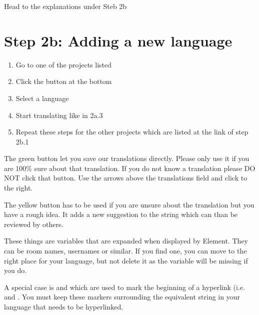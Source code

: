 \documentclass[letterpaper,10pt,openany,oneside,english]{sphinxmanual}
\begin{document}
\sphinxAtStartPar
Head to the explanations under Steb 2b


\chapter{Step 2b: Adding a new language}
\label{\detokenize{translating:step-2b-adding-a-new-language}}\begin{enumerate}
%
\item {} 
\sphinxAtStartPar
Go to one of the projects listed 

\item {} 
\sphinxAtStartPar
Click the  button at the bottom

\item {} 
\sphinxAtStartPar
Select a language

\item {} 
\sphinxAtStartPar
Start translating like in 2a.3

\item {} 
\sphinxAtStartPar
Repeat these steps for the other projects which are listed at the link of step 2b.1

\end{enumerate}

\sphinxAtStartPar
The green button let you save our translations directly. Please only use it if you are 100\% sure about that translation. If you do not know a translation please DO NOT click that button. Use the arrows above the translations field and click to the right.

\sphinxAtStartPar
The yellow button has to be used if you are unsure about the translation but you have a rough idea. It adds a new suggestion to the string which can than be reviewed by others.

\sphinxAtStartPar
These things are variables that are expanded when displayed by Element. They can be room names, usernames or similar. If you find one, you can move to the right place for your language, but not delete it as the variable will be missing if you do.

\sphinxAtStartPar
A special case is  and  which are used to mark the beginning of a hyperlink (i.e.  and .  You must keep these markers surrounding the equivalent string in your language that needs to be hyperlinked.
\end{document}
